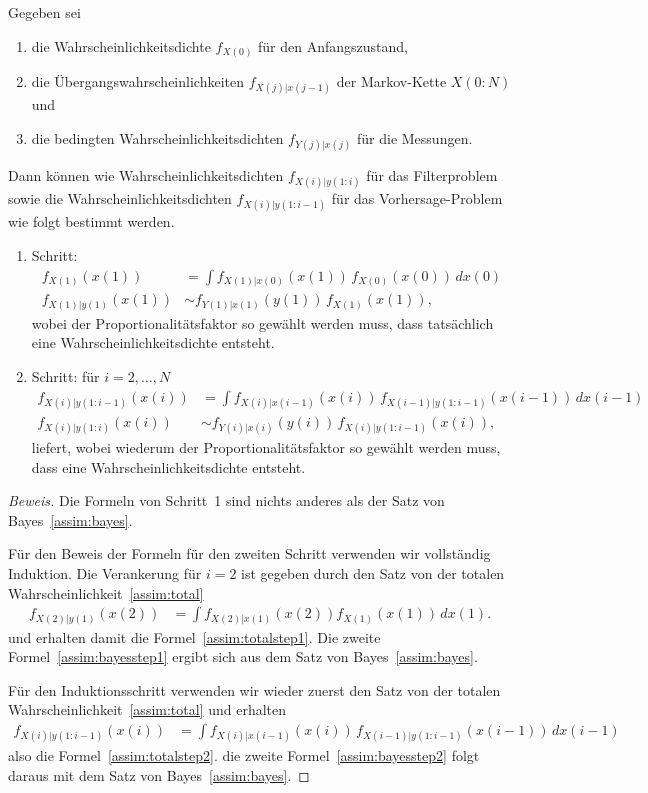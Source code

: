 \begin{satz}
Gegeben sei
\begin{enumerate}
\item die Wahrscheinlichkeitsdichte $f_{X(0)}$ für den Anfangszustand,
\item die Übergangswahrscheinlichkeiten $f_{X(j)|x(j-1)}$ der
Markov-Kette $X(0:N)$ und
\item die bedingten Wahrscheinlichkeitsdichten $f_{Y(j)|x(j)}$ für die
Messungen.
\end{enumerate}
Dann können wie Wahrscheinlichkeitsdichten $f_{X(i)|y(1:i)}$ für das
Filterproblem sowie die Wahrscheinlichkeitsdichten $f_{X(i)|y(1:i-1)}$
für das Vorhersage-Problem wie folgt bestimmt werden.
\begin{enumerate}
\item Schritt:
\begin{align}
f_{X(1)}(x(1))
&=
\int f_{X(1)|x(0)}(x(1)) \, f_{X(0)}(x(0))\, dx(0)
\label{assim:totalstep1}
\\
f_{X(1)|y(1)}(x(1))
&\sim
f_{Y(1)|x(1)}(y(1))\, f_{X(1)}(x(1)),
\label{assim:bayesstep1}
\end{align}
wobei der Proportionalitätsfaktor so gewählt werden muss, dass tatsächlich
eine Wahrscheinlichkeitsdichte entsteht.
\item Schritt: für $i=2,\dots,N$
\begin{align}
f_{X(i)|y(1:i-1)}(x(i))
&=
\int f_{X(i)|x(i-1)}(x(i))\, f_{X(i-1)|y(1:i-1)}(x(i-1))\,dx(i-1)
\label{assim:totalstep2}
\\
f_{X(i)|y(1:i)}(x(i))
&\sim
f_{Y(i)|x(i)}(y(i))\, f_{X(i)|y(1:i-1)}(x(i)),
\label{assim:bayesstep2}
\end{align}
liefert,
wobei wiederum der Proportionalitätsfaktor so gewählt werden muss, dass
eine Wahrscheinlichkeitsdichte entsteht.
\end{enumerate}
\end{satz}

\begin{proof}[Beweis]
Die Formeln von Schritt~1 sind nichts anderes als der Satz von
Bayes~\eqref{assim:bayes}.

Für den Beweis der Formeln für den zweiten Schritt verwenden wir 
vollständig Induktion.
Die Verankerung für $i=2$ ist gegeben durch den Satz von der totalen
Wahrscheinlichkeit~\eqref{assim:total}
\begin{align*}
f_{X(2)|y(1)}(x(2))
&=
\int f_{X(2)|x(1)}(x(2))  f_{X(1)}(x(1))\, dx(1).
\end{align*}
und erhalten damit die Formel~\eqref{assim:totalstep1}.
Die zweite Formel~\eqref{assim:bayesstep1} ergibt sich aus dem Satz
von Bayes~\eqref{assim:bayes}.

Für den Induktionsschritt verwenden wir wieder zuerst den Satz von der
totalen Wahrscheinlichkeit~\eqref{assim:total} und erhalten
\begin{align*}
f_{X(i)|y(1:i-1)}(x(i))
&=
\int f_{X(i)|x(i-1)}(x(i)) \, f_{X(i-1)|y(1:i-1)}(x(i-1))\,dx(i-1)
\end{align*}
also die Formel~\eqref{assim:totalstep2}.
die zweite Formel~\eqref{assim:bayesstep2} folgt daraus mit dem Satz
von Bayes~\eqref{assim:bayes}.
\end{proof}


